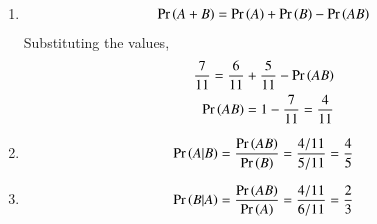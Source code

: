 \begin{enumerate}
\item 
\begin{align}
\Pr\left(A + B\right) = \Pr\left(A\right) + \Pr\left(B\right) - \Pr\left(AB\right)
\end{align}
Substituting the values,
\begin{align}
\frac{7}{11} = \frac{6}{11} + \frac{5}{11} - \Pr\left(AB\right)\\
 \Pr\left(AB\right) = 1 - \frac{7}{11} = \frac{4}{11}
\end{align}
\item
\begin{align}
\Pr\left(A|B\right) = \frac{\Pr\left(AB\right)}{\Pr\left(B\right)} = \frac{4/11}{5/11} = \frac{4}{5}
\end{align}
\item
\begin{align}
\Pr\left(B|A\right) = \frac{\Pr\left(AB\right)}{\Pr\left(A\right)} = \frac{4/11}{6/11} = \frac{2}{3}
\end{align}
\end{enumerate}